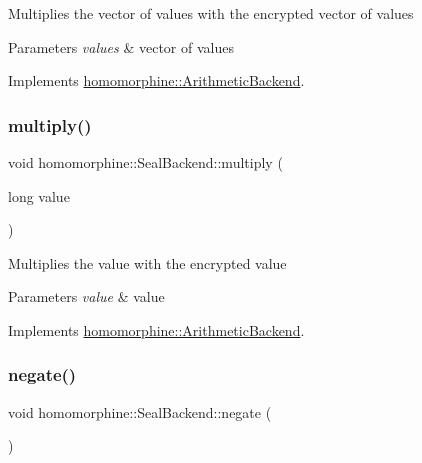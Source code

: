 Multiplies the vector of values with the encrypted vector of values


\begin{DoxyParams}{Parameters}
{\em values} & vector of values \\
\hline
\end{DoxyParams}


Implements \mbox{\hyperlink{classhomomorphine_1_1_arithmetic_backend_a80f2424d26fcfad4803f6a0e5a9cdd2d}{homomorphine\+::\+Arithmetic\+Backend}}.

\mbox{\label{classhomomorphine_1_1_seal_backend_afd8f13068d81c0038b966df4219e8033}} 
\subsubsection{\texorpdfstring{multiply()}{multiply()}\hspace{0.1cm}{\footnotesize\ttfamily [2/2]}}
{\footnotesize\ttfamily void homomorphine\+::\+Seal\+Backend\+::multiply (\begin{DoxyParamCaption}\item[{long}]{value }\end{DoxyParamCaption})\hspace{0.3cm}{\ttfamily [virtual]}}

Multiplies the value with the encrypted value


\begin{DoxyParams}{Parameters}
{\em value} & value \\
\hline
\end{DoxyParams}


Implements \mbox{\hyperlink{classhomomorphine_1_1_arithmetic_backend_a22f4c598c5a3987ef6efe5925f4c5b81}{homomorphine\+::\+Arithmetic\+Backend}}.

\mbox{\label{classhomomorphine_1_1_seal_backend_a9064cf9822de85af9120528cef084bea}} 
\subsubsection{\texorpdfstring{negate()}{negate()}}
{\footnotesize\ttfamily void homomorphine\+::\+Seal\+Backend\+::negate (\begin{DoxyParamCaption}{ }\end{DoxyParamCaption})\hspace{0.3cm}{\ttfamily [virtual]}}

